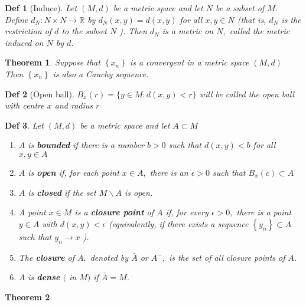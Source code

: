 \documentclass[10pt]{paper}
\newtheorem{theorem}{Theorem}[section]
\newtheorem{definition}{Def}[section]
\begin{document}
\begin{definition}[Induce]
    Let $(M, d)$ be a metric space and let $N$ be a subset of $M .$ Define $d_{N}: N \times N \rightarrow \mathbb{R}$ by $d_{N}(x, y)=d(x, y)$ for all $x, y \in N$ (that is, $d_{N}$ is the restriction of $d$ to the subset $N$ ). Then $d_{N}$ is a metric on $N,$ called the metric induced on $N$ by $d$.
\end{definition}

\begin{theorem}
    Suppose that $\left\{x_{n}\right\}$ is a convergent in a metric space $(M, d)$ Then $\left\{x_{n}\right\}$ is also a Cauchy sequence.
\end{theorem}

\begin{definition}[Open ball]
    $B_{x}(r)=\{y \in M: d(x, y)<r\}$ will be called the open ball with centre $x$ and radius $r$
\end{definition}

\begin{definition}
    Let $(M, d)$ be a metric space and let $A \subset M$
    \begin{enumerate}
        \item $A$ is \textbf{bounded} if there is a number $b>0$ such that $d(x, y)<b$ for all $x, y \in A$
        \item $A$ is \textbf{open} if, for each point $x \in A,$ there is an $\epsilon>0$ such that $B_{x}(c) \subset A$
        \item $A$ is \textbf{closed} if the set $M \backslash A$ is open.
        \item  A point $x \in M$ is a \textbf{closure point} of $A$ if, for every $\epsilon>0,$ there is a point $y \in A$ with $d(x, y)<\epsilon$ (equivalently, if there exists a sequence $\left\{y_{n}\right\} \subset A$ such that $y_{n} \rightarrow x$ ).
        \item  The \textbf{closure} of $A,$ denoted by $\bar{A}$ or $A^{-},$ is the set of all closure points of $A$.
        \item  $A$ is \textbf{dense} $($ in $M)$ if $\bar{A}=M$.
    \end{enumerate}
\end{definition}

\begin{theorem}
    
\end{theorem}
\end{document}
